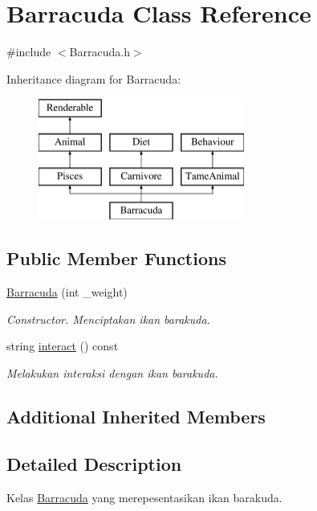 \hypertarget{classBarracuda}{\section{Barracuda Class Reference}
\label{classBarracuda}
}


{\ttfamily \#include $<$Barracuda.\+h$>$}

Inheritance diagram for Barracuda\+:\begin{figure}[H]
\begin{center}
\leavevmode
\includegraphics[height=4.000000cm]{classBarracuda}
\end{center}
\end{figure}
\subsection*{Public Member Functions}
\begin{DoxyCompactItemize}
\item 
\hypertarget{classBarracuda_af12ecb7d4914ab078da251f702cfb2bf}{\hyperlink{classBarracuda_af12ecb7d4914ab078da251f702cfb2bf}{Barracuda} (int \+\_\+weight)}\label{classBarracuda_af12ecb7d4914ab078da251f702cfb2bf}

\begin{DoxyCompactList}\small\item\em Constructor. Menciptakan ikan barakuda. \end{DoxyCompactList}\item 
string \hyperlink{classBarracuda_aceb93a0bb776083679e70965159e17bc}{interact} () const 
\begin{DoxyCompactList}\small\item\em Melakukan interaksi dengan ikan barakuda. \end{DoxyCompactList}\end{DoxyCompactItemize}
\subsection*{Additional Inherited Members}


\subsection{Detailed Description}
Kelas \hyperlink{classBarracuda}{Barracuda} yang merepesentasikan ikan barakuda. 

